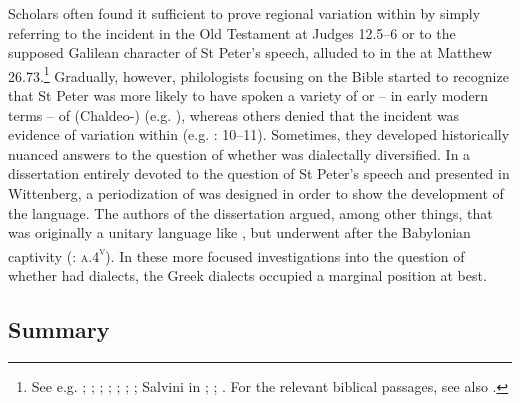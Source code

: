 Scholars often found it sufficient to prove regional variation within  by simply referring to the  incident in the Old Testament at Judges 12.5–6 or to the supposed Galilean character of St Peter’s speech, alluded to in the  at Matthew 26.73.\footnote{See e.g. \citet[6]{Bovelles1533}; \citet[\textsc{b.3}\textsc{\textsuperscript{v}}]{Bachmann1625}; \citet[102]{Weemes1632}; \citet[2]{Wyss1650}; \citet[18]{Walton1657}; \citet[180]{Webb1669}; \citet[6]{Kiesling1712}; Salvini in \citet[103]{Muratori1724}; \citet[30]{Hauptmann1751}; \citet[13--14]{Hof1772}. For the relevant biblical passages, see also \citet[199--200]{VanRooy2018b}.} Gradually, however, philologists focusing on the Bible started to recognize that St Peter was more likely to have spoken a variety of  or – in early modern terms – of (Chaldeo-) (e.g. \citealt{Pfeiffer1663}), whereas others denied that the  incident was evidence of variation within  (e.g. \citealt{Mayer1629}: 10–11). Sometimes, they developed historically nuanced answers to the question of whether  was dialectally diversified. In a dissertation entirely devoted to the question of St Peter’s speech and presented in Wittenberg, a periodization of  was designed in order to show the development of the language. The authors of the dissertation argued, among other things, that  was originally a unitary language like , but underwent  after the Babylonian captivity (\citealt{Pfeiffer1663}: \textsc{a.4}\textsc{\textsuperscript{v}}). In these more focused investigations into the question of whether  had dialects, the Greek dialects occupied a marginal position at best.

\subsection{Summary}

